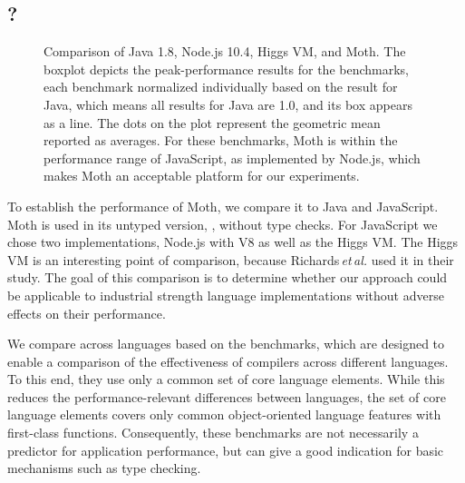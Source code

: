 \subsection{\AWFY?}
\label{sec:baseline-perf}


\begin{figure}
  \centering
	\AwfyBaseline{}
	\caption{Comparison of Java 1.8, Node.js 10.4, Higgs VM, and Moth.
  The boxplot depicts the peak-performance results for the \AWFY benchmarks,
  each benchmark normalized individually based on the result for Java,
  which means all results for Java are 1.0, and its box appears as a line.
  The dots on the plot represent the geometric mean reported as averages.
  For these benchmarks, Moth is within the performance range
  of JavaScript, as implemented by Node.js,
  which makes Moth an acceptable platform for our experiments.
  }
	\label{fig:awfy-baseline}
\end{figure}

To establish the performance of Moth,
we compare it to Java and JavaScript.
Moth is used in its untyped version, \ie, without type checks.
For JavaScript we chose two implementations,
Node.js with V8 as well as the Higgs VM.
The Higgs VM is an interesting point of comparison,
because Richards\,\emph{et\,al.}\citep{Richards2017} used it in their study.
The goal of this comparison is to determine whether our approach
could be applicable to industrial strength language implementations
without adverse effects on their performance.

We compare across languages based on the \AWFY benchmarks\citep{Marr2016},
which are designed to enable a comparison
of the effectiveness of compilers across different languages.
To this end, they use only a common set of core language elements.
While this reduces the performance-relevant differences between languages,
the set of core language elements covers only common object-oriented language
features with first-class functions.
Consequently, these benchmarks are not necessarily a predictor
for application performance,
but can give a good indication for basic mechanisms such as type checking.

